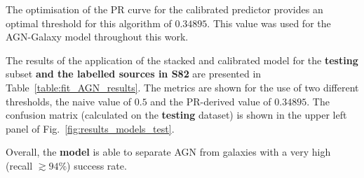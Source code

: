 \documentclass{aa}
\begin{document}
\begin{table}
  \caption{Best performing models for the AGN-galaxy classification}             %
  \label{table:fit_AGN_models}      %
  \centering                          %
  \end{table}

The optimisation of the PR curve for the calibrated predictor provides an optimal threshold for this algorithm of $0.34895$. This value was used for the AGN-Galaxy model throughout this work.

The results of the application of the stacked and calibrated model for the \textbf{testing} subset \textbf{and the labelled sources in S82} are presented in Table~\ref{table:fit_AGN_results}. The metrics are shown for the use of two different thresholds, the naive value of $0.5$ and the  PR-derived value of $0.34895$. The confusion matrix (calculated on the \textbf{testing} dataset) is shown in the upper left panel of Fig.~\ref{fig:results_models_test}. 

Overall, the \textbf{model} is able to separate AGN from galaxies with a very high (recall ${\gtrsim} 94\%$) success rate.
\end{document}
